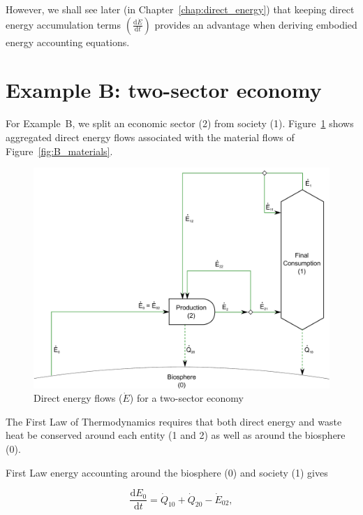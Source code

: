 However, we shall see later (in Chapter~\ref{chap:direct_energy}) 
that keeping direct energy accumulation terms
$\left( \frac{\mathrm{d}\dot{E}}{\mathrm{d}t} \right)$ 
provides an advantage when deriving embodied energy accounting equations.


\section{Example B: two-sector economy} %
\label{sec:B_energy}

For Example~B, we split an economic sector (2) from 
society (1). Figure~\ref{fig:B_energy} shows aggregated
direct energy flows associated with the material flows of Figure~\ref{fig:B_materials}.

\begin{figure}[!ht]
\centering
\includegraphics[width=0.8\linewidth]{Part_1/Chapter_Energy/images/2_sector_direct_energy.pdf}
\caption[Direct energy flows for a two-sector economy]{Direct energy flows ($\dot{E}$) for a two-sector economy}
\label{fig:B_energy}
\end{figure}

The First Law of Thermodynamics
requires that both 
direct energy and 
waste heat 
be conserved around each 
entity (1 and 2) as well as around the biosphere (0).

First Law energy accounting around the biosphere (0) and society (1) gives

\begin{equation} \label{eq:CV_E_dot_0}
	\frac{\mathrm{d}E_{0}}{\mathrm{d}t} 	 
	= \dot{Q}_{10} 
	+ \dot{Q}_{20} 
	- \dot{E}_{02},
\end{equation}

